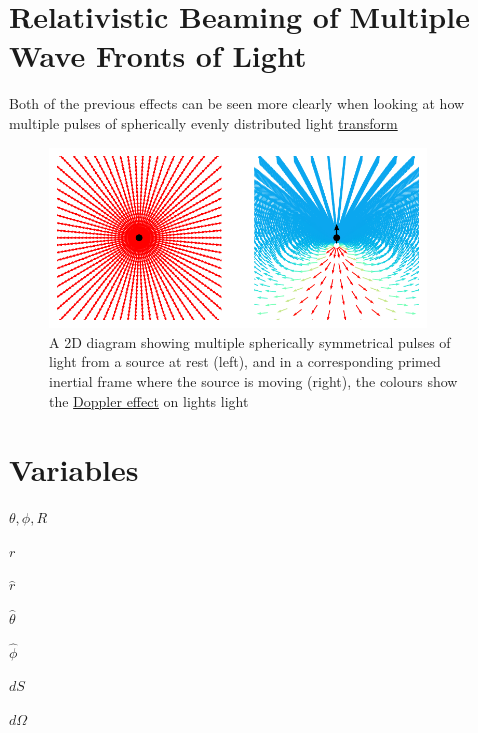 \section{Relativistic Beaming of Multiple Wave Fronts of Light}

Both of the previous effects can be seen more clearly when looking at how multiple pulses of spherically evenly distributed light \hyperlink{def-transform}{transform}
\begin{figure}[ht]
	\centering
	\includegraphics[width=10cm]{images/pdf/Still_Retarded_Field_Both_Frames.pdf}
	\caption{A 2D diagram showing multiple spherically symmetrical pulses of light from a source at rest  (left), and in a corresponding primed inertial frame where the source is moving (right), the colours show the \protect\hyperlink{def-doppler-effect}{Doppler effect} on lights light}
	\label{fig: full field transformation}
\end{figure}


\section{Variables}


$\theta, \phi, R$ \newline

$r$ \newline

$\hat{r}$ \newline

$\hat{\theta}$ \newline

$\hat{\phi}$ \newline

$dS$ \newline

$d\Omega$ \newline

